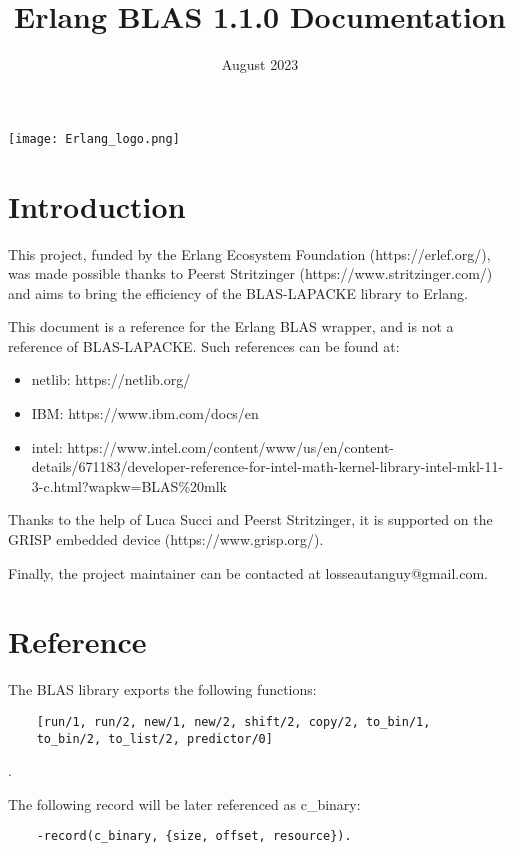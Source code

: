 \documentclass{article}
\title{Erlang BLAS 1.1.0 Documentation}
\date{August 2023}
\begin{document}
\maketitle

\texttt{[image: Erlang\_logo.png]}

\newpage
\tableofcontents
\newpage

\section{Introduction}
This project, funded by the Erlang Ecosystem Foundation (https://erlef.org/), was made possible thanks to Peerst Stritzinger (https://www.stritzinger.com/)
and aims to bring the efficiency of the BLAS-LAPACKE library to Erlang.\newline

This document is a reference for the Erlang BLAS wrapper, and is not a reference of BLAS-LAPACKE. Such references can be found at:
\begin{itemize}
    \item netlib: https://netlib.org/
    \item IBM: https://www.ibm.com/docs/en
    \item intel: https://www.intel.com/content/www/us/en/content-details/671183/developer-reference-for-intel-math-kernel-library-intel-mkl-11-3-c.html?wapkw=BLAS\%20mlk
\end{itemize}

Thanks to the help of Luca Succi and Peerst Stritzinger, it is supported on the GRISP embedded device (https://www.grisp.org/).\newline

Finally, the project maintainer can be contacted at losseautanguy@gmail.com.

\newpage

\section{Reference}
The BLAS library exports the following functions:
\begin{verbatim}
    [run/1, run/2, new/1, new/2, shift/2, copy/2, to_bin/1,
    to_bin/2, to_list/2, predictor/0]
\end{verbatim}.

The following record will be later referenced as c\_binary:
\begin{verbatim}
    -record(c_binary, {size, offset, resource}).
\end{verbatim}
\end{document}
